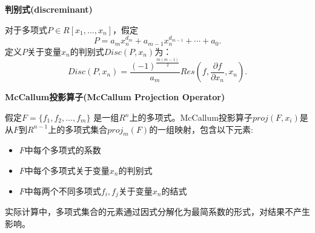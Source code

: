 \begin{definition}{\textbf{判别式(discreminant)}}

对于多项式$P \in R[x_1, ..., x_n]$，假定$$
P = a_m x_n^{d_m} + a_{m-1} x_n^{d_{m-1}} + \cdots + a_0.
$$
定义$P$关于变量$x_n$的判别式$Disc(P, x_n)$为：  
$$
Disc(P, x_n) = \frac{(-1)^{\frac{m(m-1)}{2}}}{a_m} Res(f, \frac{\partial f}{\partial x_n}, x_n). 
$$
\end{definition}

\begin{definition}{\textbf{McCallum投影算子(McCallum Projection Operator)}}

假定$F = \{f_1, f_2, \dots, f_m\}$ 是一组$R^n$上的多项式。McCallum投影算子$proj(F, x_i)$是从$F$到$R^{n-1}$上的多项式集合$proj_m(F)$的一组映射，包含以下元素:
\begin{itemize}
    \item $F$中每个多项式的系数
    \item $F$中每个多项式关于变量$x_n$的判别式
    \item $F$中每两个不同多项式$f_i, f_j$关于变量$x_n$的结式
\end{itemize}
实际计算中，多项式集合的元素通过因式分解化为最简系数的形式，对结果不产生影响。
\end{definition}

